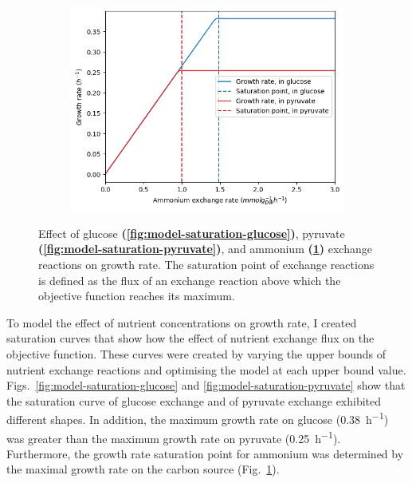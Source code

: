 \begin{figure}
  \begin{subfigure}[t]{0.45\textwidth}
  \centering
    \includegraphics[width=\linewidth]{saturation_amm}
    \caption{
    }
    \label{fig:model-saturation-ammonium}
  \end{subfigure}

  \caption[
    Effect of exchange reactions on growth rate
  ]{
    Effect of glucose \textbf{(\ref{fig:model-saturation-glucose})}, pyruvate \textbf{(\ref{fig:model-saturation-pyruvate})}, and ammonium \textbf{(\ref{fig:model-saturation-ammonium})} exchange reactions on growth rate.
    The saturation point of exchange reactions is defined as the flux of an exchange reaction above which the objective function reaches its maximum.
  }
  \label{fig:model-saturation}
\end{figure}

To model the effect of nutrient concentrations on growth rate, I created saturation curves that show how the effect of nutrient exchange flux on the objective function.
These curves were created by varying the upper bounds of nutrient exchange reactions and optimising the model at each upper bound value.
Figs.\ \ref{fig:model-saturation-glucose} and \ref{fig:model-saturation-pyruvate} show that the saturation curve of glucose exchange and of pyruvate exchange exhibited different shapes.
In addition, the maximum growth rate on glucose (\SI{0.38}{\hour^{-1}}) was greater than the maximum growth rate on pyruvate (\SI{0.25}{\hour^{-1}}).
Furthermore, the growth rate saturation point for ammonium was determined by the maximal growth rate on the carbon source (Fig.\ \ref{fig:model-saturation-ammonium}).

